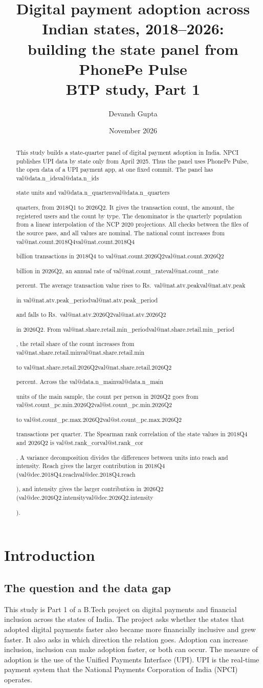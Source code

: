 \documentclass[11pt,a4paper]{article}
\title{Digital payment adoption across Indian states, 2018--2026:\\
  building the state panel from PhonePe Pulse\\[0.5ex]
  \large BTP study, Part 1}
\author{Devansh Gupta}
\date{November 2026}
\makeatletter
\newcommand{\val}[1]{\ifcsname val@#1\endcsname\csname val@#1\endcsname\else
  \PackageError{study}{Unknown value key `#1'}{Run Rscript src/R/part1_study.R}\fi}
\makeatother
\begin{document}
\maketitle

\begin{abstract}
This study builds a state-quarter panel of digital payment adoption in India. NPCI publishes UPI data by state only from April 2025. Thus the panel uses PhonePe Pulse, the open data of a UPI payment app, at one fixed commit. The panel has \val{data.n_ids} state units and \val{data.n_quarters} quarters, from 2018Q1 to 2026Q2. It gives the transaction count, the amount, the registered users and the count by type. The denominator is the quarterly population from a linear interpolation of the NCP 2020 projections. All checks between the files of the source pass, and all values are nominal. The national count increases from \val{nat.count.2018Q4} billion transactions in 2018Q4 to \val{nat.count.2026Q2} billion in 2026Q2, an annual rate of \val{nat.count_rate} percent. The average transaction value rises to Rs.~\val{nat.atv.peak} in \val{nat.atv.peak_period} and falls to Rs.~\val{nat.atv.2026Q2} in 2026Q2. From \val{nat.share.retail.min_period}, the retail share of the count increases from \val{nat.share.retail.min} to \val{nat.share.retail.2026Q2} percent. Across the \val{data.n_main} units of the main sample, the count per person in 2026Q2 goes from \val{st.count_pc.min.2026Q2} to \val{st.count_pc.max.2026Q2} transactions per quarter. The Spearman rank correlation of the state values in 2018Q4 and 2026Q2 is \val{st.rank_cor}. A variance decomposition divides the differences between units into reach and intensity. Reach gives the larger contribution in 2018Q4 (\val{dec.2018Q4.reach}), and intensity gives the larger contribution in 2026Q2 (\val{dec.2026Q2.intensity}).
\end{abstract}

\section{Introduction}\label{sec:intro}

\subsection{The question and the data gap}
This study is Part 1 of a B.Tech project on digital payments and financial inclusion across the states of India. The project asks whether the states that adopted digital payments faster also became more financially inclusive and grew faster. It also asks in which direction the relation goes. Adoption can increase inclusion, inclusion can make adoption faster, or both can occur. The measure of adoption is the use of the Unified Payments Interface (UPI). UPI is the real-time payment system that the National Payments Corporation of India (NPCI) operates.
\end{document}
